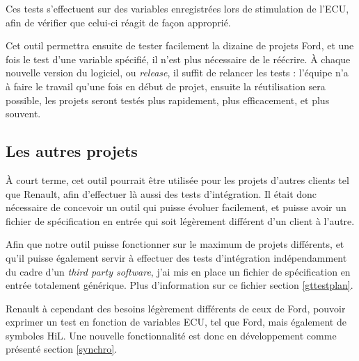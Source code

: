 	Ces tests s'effectuent sur des variables enregistrées lors de stimulation de l'ECU, afin de vérifier que celui-ci réagit de façon approprié.

	Cet outil permettra ensuite de tester facilement la dizaine de projets Ford, et une fois le test d'une variable spécifié, il n'est plus nécessaire de le réécrire. À chaque nouvelle version du logiciel, ou \textit{release}, il suffit de relancer les tests : l'équipe n'a à faire le travail qu'une fois en début de projet, ensuite la réutilisation sera possible, les projets seront testés plus rapidement, plus efficacement, et plus souvent.

	\subsection{Les autres projets}
	À court terme, cet outil pourrait être utilisée pour les projets d'autres clients tel que Renault, afin d'effectuer là aussi des tests d'intégration. Il était donc nécessaire de concevoir un outil qui puisse évoluer facilement, et puisse avoir un fichier de spécification en entrée qui soit légèrement différent d'un client à l'autre.
	
	Afin que notre outil puisse fonctionner sur le maximum de projets différents, et qu'il puisse également servir à effectuer des tests d'intégration indépendamment du cadre d'un \textit{third party software}, j'ai mis en place un fichier de spécification en entrée totalement générique. Plus d'information sur ce fichier section \ref{gttestplan}.
	
	Renault à cependant des besoins légèrement différents de ceux de Ford, pouvoir exprimer un test en fonction de variables ECU, tel que Ford, mais également de symboles HiL. Une nouvelle fonctionnalité est donc en développement comme présenté section \ref{synchro}.

